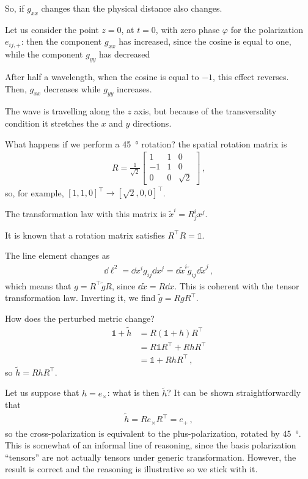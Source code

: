 \documentclass[main.tex]{subfiles}
\begin{document}
So, if \(g_{xx}\) changes than the physical distance also changes. 

Let us consider the point \(z=0\), at \(t=0\), with zero phase \(\varphi \) for the polarization \(e_{ij, +}\): then the component \(g_{xx}\) has increased, since the cosine is equal to one, while the component \(g_{yy}\) has decreased

After half a wavelength, when the cosine is equal to \(-1\), this effect reverses. Then, \(g_{xx}\) decreases while \(g_{yy} \) increases. 

The wave is travelling along the \(z\) axis, but because of the transversality condition it stretches the \(x\) and \(y\) directions. 

What happens if we perform a \SI{45}{\degree} rotation? the spatial rotation matrix is 
%
\begin{subequations}
\begin{align}
R = \frac{1}{\sqrt{2}} \left[\begin{array}{ccc}
1 & 1 & 0 \\ 
-1 & 1 & 0 \\ 
0 & 0 & \sqrt{2}
\end{array}\right]
\,,
\end{align}
\end{subequations}
%
so, for example, \([1,1,0]^{\top} \rightarrow [\sqrt{2},0,0]^{\top}\). 

The transformation law with this matrix is \(\widetilde{x}^{i} = R_{j}^{i} x^{j}\).

It is known that a rotation matrix satisfies \(R^{\top} R = \mathbb{1}\). 

The line element changes as 
%
\begin{align}
\dd{\ell^2} = \dd{x^{i}} g_{ij} \dd{x^{j}} = \dd{\widetilde{x}^{i} } \widetilde{g}_{ij} \dd{\widetilde{x}^{j}}
\,,
\end{align}
%
which means that \(g = R^{\top} \widetilde{g} R\), since \(\dd{\widetilde{x}} = R \dd{x}\). This is coherent with the tensor transformation law. Inverting it, we find \(\widetilde{g} = R g R^{\top}\). 

How does the perturbed metric change? 
%
\begin{subequations}
\begin{align}
\mathbb{1} + \widetilde{h} &= R (\mathbb{1} + h) R^{\top}  \\
&= R \mathbb{1} R^{\top} + R h R^{\top}  \\
&= \mathbb{1} + R h R^{\top} 
\,,
\end{align}
\end{subequations}
%
so \(\widetilde{h} = R h R^{\top}\). 

Let us suppose that \(h = e_{ \times }\): what is then \(\widetilde{h}\)? It can be shown straightforwardly that 
%
\begin{align}
\widetilde{h} = R e_{ \times } R^{\top} = e_{+}
\,,
\end{align}
%
so the cross-polarization is equivalent to the plus-polarization, rotated by \SI{45}{\degree}. 
This is somewhat of an informal line of reasoning, since the basis polarization ``tensors'' are not actually tensors under generic transformation. However, the result is correct and the reasoning is illustrative so we stick with it.
\end{document}
